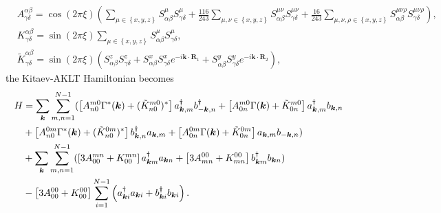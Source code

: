\documentclass[11pt, aps, longbibliography]{article}
\begin{document}
\begin{align}
    &A^{\alpha\beta}_{\gamma\delta} = \cos (2\pi\xi) \left( \sum_{\mu\in \left\{ x,y,z \right\}} S^\mu_{\alpha\beta}S^\mu_{\gamma\delta} + \frac{116}{243}\sum_{\mu,\nu \in \left\{ x,y,z \right\}} S^{\mu\nu}_{\alpha\beta}S^{\mu\nu}_{\gamma\delta}  + \frac{16}{243}\sum_{\mu,\nu,\rho \in \left\{ x,y,z \right\}} S^{\mu\nu\rho}_{\alpha\beta}S^{\mu\nu\rho}_{\gamma\delta} \right), \\
    &K^{\alpha\beta}_{\gamma\delta} = \sin(2\pi \xi) \sum_{\mu\in \left\{ x,y,z \right\}}S^\mu_{\alpha\beta}S^\mu_{\gamma\delta}, \\
    &\tilde{K}^{\alpha\beta}_{\gamma\delta} = \sin(2\pi \xi) \left( S^z_{\alpha\beta}S^z_{\gamma\delta} + S^x_{\alpha\beta}S^x_{\gamma\delta}e^{-i\bm{k}\cdot \bm{R}_1}  + S^y_{\alpha\beta}S^y_{\gamma\delta}e^{-i\bm{k}\cdot \bm{R}_2} \right) ,
\end{align}
the Kitaev-AKLT Hamiltonian becomes
\begin{align}
    H &= \sum_{\bm{k}}\sum_{m,n=1}^{N-1}( \left[A^{m0}_{n0}\Gamma^*(\bm{k}) + (\tilde{K}^{m0}_{n0})^*  \right] a_{\bm{k},m}^\dagger b_{-\bm{k},n}^\dagger +  \left[A^{m0}_{0n}\Gamma(\bm{k}) + \tilde{K}^{m0}_{0n} \right] a_{\bm{k},m}^\dagger b_{\bm{k},n}  \notag \\
    &+ \left[A^{0m}_{n0}\Gamma^*(\bm{k}) + (\tilde{K}^{0m}_{n0})^*  \right]  b_{\bm{k},n}^\dagger a_{\bm{k},m} + \left[A^{0m}_{0n}\Gamma(\bm{k}) + \tilde{K}^{0m}_{0n}  \right] a_{\bm{k},m}  b_{-\bm{k},n}  ) \notag \\
    &+ \sum_{\bm{k}}\sum_{m,n=1}^{N-1} (\left[3A^{mn}_{00} + {K}^{mn}_{00} \right]a_{\bm{k}m}^\dagger a_{\bm{k}n} + \left[3A^{00}_{mn} + {K}^{00}_{mn} \right]b_{\bm{k}m}^\dagger b_{\bm{k}n}) \notag \\
    &- \left[3A^{00}_{00} + {K}^{00}_{00} \right] \sum_{i=1}^{N-1} \left( a_{\bm{k}i}^\dagger a_{\bm{k}i} +b_{\bm{k}i}^\dagger b_{\bm{k}i} \right).
\end{align}
\end{document}
